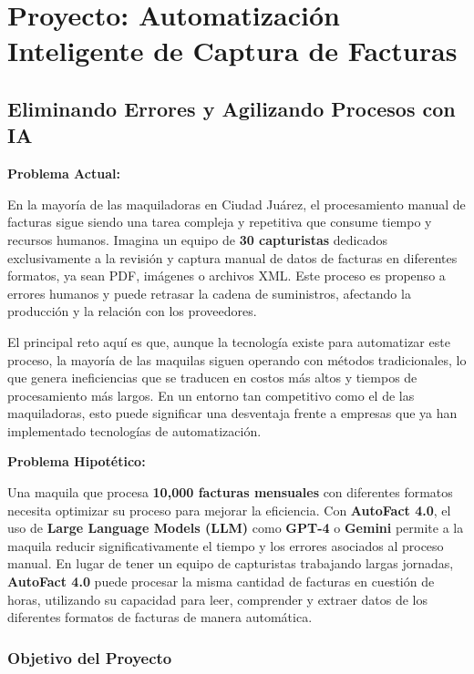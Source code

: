 
\section{Proyecto: Automatización Inteligente de Captura de Facturas}\label{sec:automatizacion-facturas}

\subsection{Eliminando Errores y Agilizando Procesos con IA}

\textbf{Problema Actual:}

En la mayoría de las maquiladoras en Ciudad Juárez, el procesamiento manual de facturas sigue siendo una tarea compleja y repetitiva que consume tiempo y recursos humanos. Imagina un equipo de \textbf{30 capturistas} dedicados exclusivamente a la revisión y captura manual de datos de facturas en diferentes formatos, ya sean PDF, imágenes o archivos XML. Este proceso es propenso a errores humanos y puede retrasar la cadena de suministros, afectando la producción y la relación con los proveedores.

El principal reto aquí es que, aunque la tecnología existe para automatizar este proceso, la mayoría de las maquilas siguen operando con métodos tradicionales, lo que genera ineficiencias que se traducen en costos más altos y tiempos de procesamiento más largos. En un entorno tan competitivo como el de las maquiladoras, esto puede significar una desventaja frente a empresas que ya han implementado tecnologías de automatización.

\textbf{Problema Hipotético:}

Una maquila que procesa \textbf{10,000 facturas mensuales} con diferentes formatos necesita optimizar su proceso para mejorar la eficiencia. Con \textbf{AutoFact 4.0}, el uso de \textbf{Large Language Models (LLM)} como \textbf{GPT-4} o \textbf{Gemini} permite a la maquila reducir significativamente el tiempo y los errores asociados al proceso manual. En lugar de tener un equipo de capturistas trabajando largas jornadas, \textbf{AutoFact 4.0} puede procesar la misma cantidad de facturas en cuestión de horas, utilizando su capacidad para leer, comprender y extraer datos de los diferentes formatos de facturas de manera automática.

\subsubsection{Objetivo del Proyecto}

